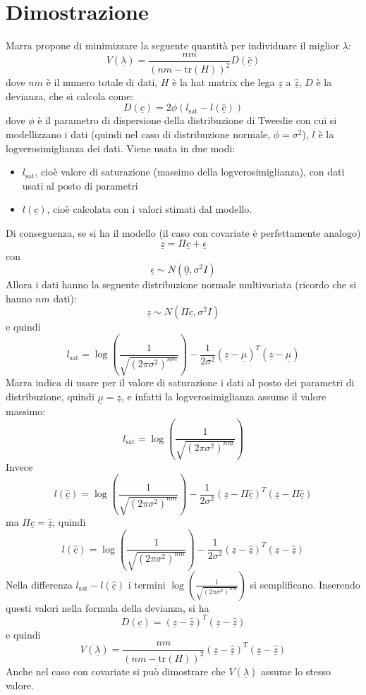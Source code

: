 \documentclass[a4paper,12pt]{report}				%
\begin{document}
\section{Dimostrazione}
Marra propone di minimizzare la seguente quantità per individuare il miglior $\underline{\lambda}$:
$$
V(\underline{\lambda})=\frac{nm}{(nm-\mbox{tr}(H))^2}D(\underline{\hat{c}})
$$
dove $nm$ è il numero totale di dati, $H$ è la hat matrix che lega $\underline{z}$ a $\underline{\hat{z}}$, $D$ è la devianza, che si calcola come:
$$
D(\underline{c})=2\phi(l_{\mbox{sat}}-l(\underline{\hat{c}}))
$$
dove $\phi$ è il parametro di dispersione della distribuzione di Tweedie con cui si modellizzano i dati (quindi nel caso di distribuzione normale, $\phi=\sigma^2$), $l$ è la logverosimiglianza dei dati.
Viene usata in due modi:
\begin{itemize}
\item $l_{\mbox{sat}}$, cioè valore di saturazione (massimo della logverosimiglianza), con dati usati al posto di parametri
\item $l(\underline{c})$, cioè calcolata con i valori stimati dal modello.
\end{itemize}
Di conseguenza, se si ha il modello (il caso con covariate è perfettamente analogo)
$$
\underline{z}=\Pi\underline{c} + \underline{\epsilon}
$$
con
$$
\underline{\epsilon} \sim N(\underline{0},\sigma^2I)
$$
Allora i dati hanno la seguente distribuzione normale multivariata (ricordo che si hanno $nm$ dati):
$$
\underline{z} \sim N(\Pi\underline{c},\sigma^2I)
$$
e quindi
$$
l_{\mbox{sat}}=\log(\frac{1}{\sqrt{(2\pi\sigma^2)^{nm}}}) -\frac{1}{2\sigma^2}(\underline{z}-\underline{\mu})^T(\underline{z}-\underline{\mu})
$$
Marra indica di usare per il valore di saturazione i dati al posto dei parametri di distribuzione, quindi $\underline{\mu}=\underline{z}$, e infatti la logverosimiglianza assume il valore massimo:
$$
l_{\mbox{sat}}=\log(\frac{1}{\sqrt{(2\pi\sigma^2)^{nm}}})
$$
Invece
$$
l(\underline{\hat{c}})=\log(\frac{1}{\sqrt{(2\pi\sigma^2)^{nm}}}) -\frac{1}{2\sigma^2}(\underline{z}-\Pi\underline{\hat{c}})^T(\underline{z}-\Pi\underline{\hat{c}})
$$
ma $\Pi\underline{\hat{c}}=\underline{\hat{z}}$, quindi
$$
l(\underline{\hat{c}})=\log(\frac{1}{\sqrt{(2\pi\sigma^2)^{nm}}}) -\frac{1}{2\sigma^2}(\underline{z}-\underline{\hat{z}})^T(\underline{z}-\underline{\hat{z}})
$$
Nella differenza $l_{\mbox{sat}}-l(\underline{\hat{c}})$ i termini $\log(\frac{1}{\sqrt{(2\pi\sigma^2)^{nm}}})$ si semplificano.
\newline
\newline
Inserendo questi valori nella formula della devianza, si ha
$$
D(\underline{c})=(\underline{z}-\underline{\hat{z}})^T(\underline{z}-\underline{\hat{z}})
$$
e quindi
$$
V(\underline{\lambda})=\frac{nm}{(nm-\mbox{tr}(H))^2}(\underline{z}-\underline{\hat{z}})^T(\underline{z}-\underline{\hat{z}})
$$
Anche nel caso con covariate si può dimostrare che $V(\underline{\lambda})$ assume lo stesso valore.
\end{document}
